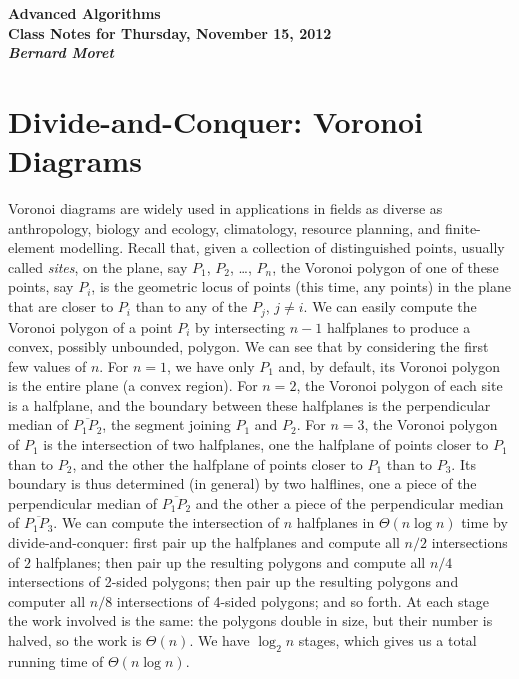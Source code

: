 \documentclass[11pt]{article}
\begin{document}
\begin{center}
  \LARGE\bf Advanced Algorithms\\

  \Large\sf
  Class Notes for Thursday, November 15, 2012\\

  \it
  Bernard Moret
\end{center}

\bigskip


\section{Divide-and-Conquer: Voronoi Diagrams}
Voronoi diagrams are widely used in applications in fields as
diverse as anthropology, biology and ecology, climatology, resource planning,
and finite-element modelling.  Recall that, given a collection of
distinguished points, usually called \emph{sites}, on
the plane, say $P_1$, $P_2$, \dots, $P_n$, the Voronoi polygon of one of
these points, say $P_i$, is the geometric locus of points (this time, any
points) in the plane that are closer to $P_i$ than to any of the $P_j$,
$j\not=i$.  We can easily compute the Voronoi polygon of a point $P_i$
by intersecting $n-1$ halfplanes to produce a convex, possibly unbounded,
polygon.  We can see that by considering the first few values of $n$.
For $n=1$, we have only $P_1$ and, by default, its Voronoi polygon is the
entire plane (a convex region).  For $n=2$, the Voronoi polygon of each site 
is a halfplane, and the boundary between these halfplanes is the perpendicular
median of $\overline{P_1 P_2}$, the segment joining $P_1$ and $P_2$.
For $n=3$, the Voronoi polygon of $P_1$ is the intersection of two halfplanes,
one the halfplane of points closer to $P_1$ than to $P_2$, and the other the
halfplane of points closer to $P_1$ than to $P_3$.  Its boundary is
thus determined (in general) by two halflines, one a piece of the
perpendicular median of $\overline{P_1 P_2}$ and the other a piece of
the perpendicular median of $\overline{P_1 P_3}$.  We can compute the
intersection of $n$ halfplanes in $\Theta(n\log n)$ time by divide-and-conquer:
first pair up the halfplanes and compute all $n/2$ intersections of $2$
halfplanes; then pair up the resulting polygons and compute all $n/4$
intersections of 2-sided polygons; then pair up the resulting polygons
and computer all $n/8$ intersections of 4-sided polygons; and so forth.
At each stage the work involved is the same: the polygons double in
size, but their number is halved, so the work is $\Theta(n)$.  We have
$\log_2 n$ stages, which gives us a total running time of $\Theta(n\log n)$.
\end{document}
